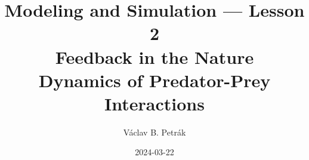 \documentclass[11pt]{beamer}
\title{
Modeling and Simulation --- Lesson 2\\
\textbf{Feedback in the Nature\\
Dynamics of Predator-Prey Interactions}}
\author{Václav B. Petrák}
\institute{Faculty of Biomedical Engineering\\
Czech Technical University}
\date{2024-03-22}
\begin{document}
\begin{frame}
  \titlepage
\end{frame}

     
    
\end{document}
